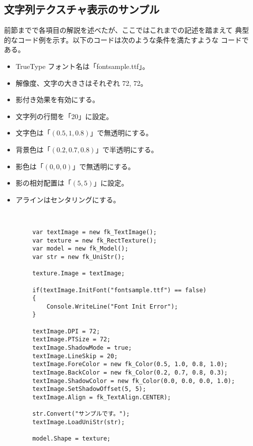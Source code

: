 \subsection{文字列テクスチャ表示のサンプル}
前節までで各項目の解説を述べたが、ここではこれまでの記述を踏まえて
典型的なコード例を示す。以下のコードは次のような条件を満たすような
コードである。
\begin{itemize}
 \item TrueType フォント名は「fontsample.ttf」。
 \item 解像度、文字の大きさはそれぞれ 72, 72。
 \item 影付き効果を有効にする。
 \item 文字列の行間を「20」に設定。
 \item 文字色は「\((0.5, 1, 0.8)\)」で無透明にする。
 \item 背景色は「\((0.2, 0.7, 0.8)\)」で半透明にする。
 \item 影色は「\((0, 0, 0)\)」で無透明にする。
 \item 影の相対配置は「\((5, 5)\)」に設定。
 \item アラインはセンタリングにする。
\end{itemize}
~ \\
\begin{breakbox}
\begin{verbatim}
        var textImage = new fk_TextImage();
        var texture = new fk_RectTexture();
        var model = new fk_Model();
        var str = new fk_UniStr();

        texture.Image = textImage;

        if(textImage.InitFont("fontsample.ttf") == false)
        {
            Console.WriteLine("Font Init Error");
        }

        textImage.DPI = 72;
        textImage.PTSize = 72;
        textImage.ShadowMode = true;
        textImage.LineSkip = 20;
        textImage.ForeColor = new fk_Color(0.5, 1.0, 0.8, 1.0);
        textImage.BackColor = new fk_Color(0.2, 0.7, 0.8, 0.3);
        textImage.ShadowColor = new fk_Color(0.0, 0.0, 0.0, 1.0);
        textImage.SetShadowOffset(5, 5);
        textImage.Align = fk_TextAlign.CENTER);

        str.Convert("サンプルです。");
        textImage.LoadUniStr(str);

        model.Shape = texture;
\end{verbatim}
\end{breakbox}

